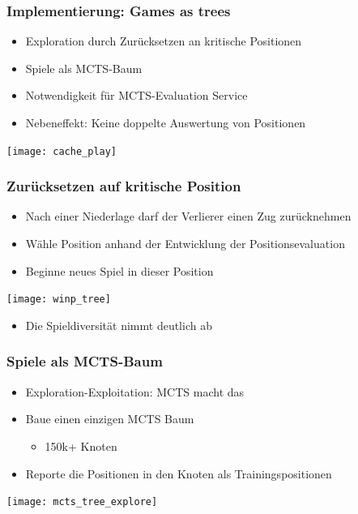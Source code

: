 \begin{frame}
 \frametitle{Implementierung: Games as trees}
  


\begin{itemize}
  \item \pause Exploration durch Zurücksetzen an kritische Positionen
  \item \pause Spiele als MCTS-Baum
  \item \pause Notwendigkeit für MCTS-Evaluation Service
  \item \pause Nebeneffekt: Keine doppelte Auswertung von Positionen
\end{itemize}
\pause \center \texttt{[image: cache\_play]}

  
\end{frame}
\begin{frame}
 \frametitle{Zurücksetzen auf kritische Position}
  


\begin{itemize}
  \item \pause Nach einer Niederlage darf der Verlierer einen Zug zurücknehmen
  \item \pause Wähle Position anhand der Entwicklung der Positionsevaluation
  \item \pause Beginne neues Spiel in dieser Position
\end{itemize}
\pause \center \texttt{[image: winp\_tree]}
\begin{itemize}
  \item \pause Die Spieldiversität nimmt deutlich ab
\end{itemize}


  
\end{frame}
\begin{frame}
 \frametitle{Spiele als MCTS-Baum}
  


\begin{itemize}
  \item \pause Exploration-Exploitation: MCTS macht das
  \item \pause Baue einen einzigen MCTS Baum
\begin{itemize}
  \item \pause 150k+ Knoten
\end{itemize}
  \item \pause Reporte die Positionen in den Knoten als Trainingspositionen
\end{itemize}
\pause \center \texttt{[image: mcts\_tree\_explore]}

  
\end{frame}

